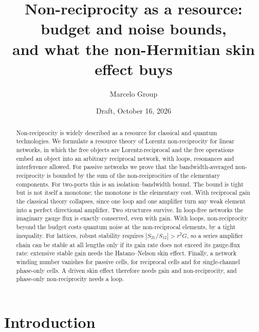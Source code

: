 \documentclass[aps,pra,twocolumn,superscriptaddress,floatfix,nofootinbib]{revtex4-2}
\theoremstyle{definition}
\begin{document}
\title{Non-reciprocity as a resource: budget and noise bounds,\\ and what the non-Hermitian skin effect buys}

\author{Marcelo Group}
\date{Draft, October 16, 2026}

\begin{abstract}
Non-reciprocity is widely described as a resource for classical and quantum technologies. We formulate a resource theory of Lorentz non-reciprocity for linear networks, in which the free objects are Lorentz-reciprocal and the free operations embed an object into an arbitrary reciprocal network, with loops, resonances and interference allowed. For passive networks we prove that the bandwidth-averaged non-reciprocity is bounded by the sum of the non-reciprocities of the elementary components. For two-ports this is an isolation--bandwidth bound. The bound is tight but is not itself a monotone; the monotone is the elementary cost. With reciprocal gain the classical theory collapses, since one loop and one amplifier turn any weak element into a perfect directional amplifier. Two structures survive. In loop-free networks the imaginary gauge flux is exactly conserved, even with gain. With loops, non-reciprocity beyond the budget costs quantum noise at the non-reciprocal elements, by a tight inequality. For lattices, robust stability requires $|S_{21}/S_{12}|>r^2G$, so a series amplifier chain can be stable at all lengths only if its gain rate does not exceed its gauge-flux rate: extensive stable gain needs the Hatano--Nelson skin effect. Finally, a network winding number vanishes for passive cells, for reciprocal cells and for single-channel phase-only cells. A driven skin effect therefore needs gain and non-reciprocity, and phase-only non-reciprocity needs a loop.
\end{abstract}

\maketitle

\section{Introduction}
\end{document}
